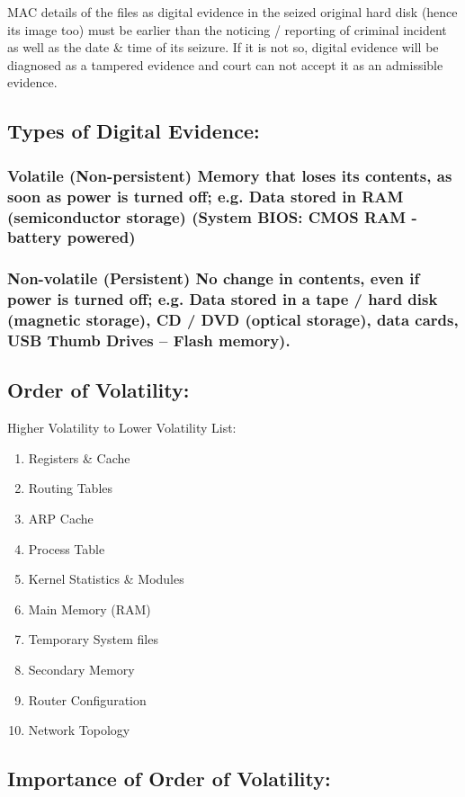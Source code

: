 \documentclass[british]{article}
\begin{document}
MAC details of the files as digital evidence in the seized original
hard disk (hence its image too) must be earlier than the noticing
/ reporting of criminal incident as well as the date \& time of its
seizure. If it is not so, digital evidence will be diagnosed as a
tampered evidence and court can not accept it as an admissible evidence.

\subsection{Types of Digital Evidence:}

\subsubsection{Volatile (Non-persistent) Memory that loses its contents, as soon
	as power is turned off; e.g. Data stored in RAM (semiconductor storage)
	(System BIOS: CMOS RAM - battery powered) }

\subsubsection{Non-volatile (Persistent) No change in contents, even if power is
	turned off; e.g. Data stored in a tape / hard disk (magnetic storage),
	CD / DVD (optical storage), data cards, USB Thumb Drives -- Flash
	memory).}

\subsection{Order of Volatility:}

Higher Volatility to Lower Volatility List:
\begin{enumerate}
	\item Registers \& Cache
	\item Routing Tables
	\item ARP Cache
	\item Process Table
	\item Kernel Statistics \& Modules
	\item Main Memory (RAM)
	\item Temporary System files
	\item Secondary Memory
	\item Router Configuration
	\item Network Topology
\end{enumerate}

\subsection{Importance of Order of Volatility:}
\end{document}
